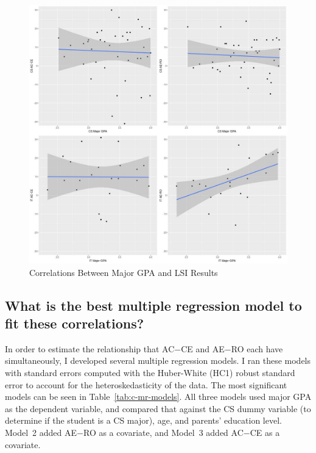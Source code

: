 \begin{figure}
  \centering
  \includegraphics[width=1.1\textwidth]{figures/chapter4/major_gpa_lm_plots.jpg}
  \caption{Correlations Between Major GPA and LSI Results}
  \label{fig:c-major_gpa_lm_plots}
\end{figure}

\subsection{What is the best multiple regression model to fit these correlations?}
In order to estimate the relationship that AC$-$CE and AE$-$RO each have simultaneously, I developed several multiple regression models. I ran these models with standard errors computed with the Huber-White (HC1) robust standard error to account for the heteroskedasticity of the data. The most significant models can be seen in Table~\ref{tab:c-mr-models}. All three models used major GPA as the dependent variable, and compared that against the CS dummy variable (to determine if the student is a CS major), age, and parents' education level. Model~2 added AE$-$RO as a covariate, and Model~3 added AC$-$CE as a covariate.

